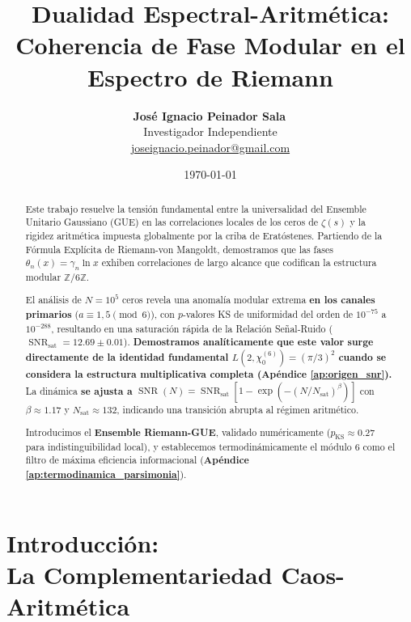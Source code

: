 \documentclass[12pt, a4paper]{article}
\title{\textbf{Dualidad Espectral-Aritmética: \\
Coherencia de Fase Modular en el Espectro de Riemann}}
\author{
  \textbf{José Ignacio Peinador Sala}\,\orcidlink{0009-0008-1822-3452} \\
  Investigador Independiente \\[2pt]
  \small\href{mailto:joseignacio.peinador@gmail.com}{joseignacio.peinador@gmail.com}
}
\date{\today}
\theoremstyle{plain}
\theoremstyle{definition}
\theoremstyle{remark}
\newcommand{\Z}{\mathbb{Z}}
\newcommand{\SNR}{\operatorname{SNR}}
\begin{document}
\maketitle

\begin{abstract}
Este trabajo resuelve la tensión fundamental entre la universalidad del Ensemble Unitario Gaussiano (GUE) en las correlaciones locales de los ceros de $\zeta(s)$ y la rigidez aritmética impuesta globalmente por la criba de Eratóstenes. Partiendo de la Fórmula Explícita de Riemann-von Mangoldt, demostramos que las fases $\theta_n(x) = \gamma_n \ln x$ exhiben correlaciones de largo alcance que codifican la estructura modular $\Z/6\Z$.

El análisis de $N=10^5$ ceros revela una anomalía modular extrema \textbf{en los canales primarios} ($a \equiv 1,5 \pmod{6}$), con $p$-valores KS de uniformidad del orden de $10^{-75}$ a $10^{-288}$, resultando en una saturación rápida de la Relación Señal-Ruido ($\SNR_{\text{sat}} = 12.69 \pm 0.01$). \textbf{Demostramos analíticamente que este valor surge directamente de la identidad fundamental $L(2,\chi_0^{(6)}) = (\pi/3)^2$ cuando se considera la estructura multiplicativa completa (Apéndice \ref{ap:origen_snr}).} La dinámica \textbf{se ajusta a} $\SNR(N) = \SNR_{\text{sat}}[1 - \exp(-(N/N_{\text{sat}})^\beta)]$ con $\beta \approx 1.17$ y $N_{\text{sat}} \approx 132$, indicando una transición abrupta al régimen aritmético.

Introducimos el \textbf{Ensemble Riemann-GUE}, validado numéricamente ($p_{\text{KS}} \approx 0.27$ para indistinguibilidad local), y establecemos termodinámicamente el módulo 6 como el filtro de máxima eficiencia informacional (\textbf{Apéndice \ref{ap:termodinamica_parsimonia}}).
\end{abstract}

\section{Introducción:\texorpdfstring{\\}{} La Complementariedad Caos-Aritmética}
\label{sec:introduccion}
\end{document}
